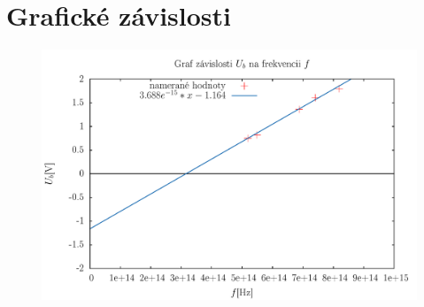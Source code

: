 \documentclass[12pt,a4paper,final]{report}
\begin{document}
\section*{Grafické závislosti}
\begin{figure}[h!]
	\centering
	\includegraphics[width=16cm,clip=true]{ify24.pdf}
\end{figure}
\end{document}
